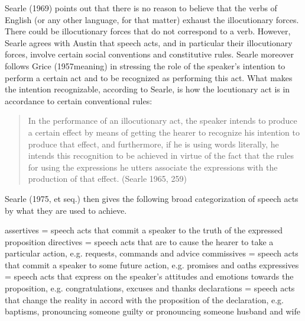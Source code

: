 Searle (1969) points out that there is no reason to believe that the verbs of English (or any other language, for that matter) exhaust the illocutionary forces. There could be illocutionary forces that do not correspond to a verb. However, Searle agrees with Austin that speech acts, and in particular their illocutionary forces, involve certain social conventions and constitutive rules. Searle moreover follows Grice (1957meaning) in stressing the role of the speaker’s intention to perform a certain act and to be recognized as performing this act. What makes the intention recognizable, according to Searle, is how the locutionary act is in accordance to certain conventional rules:

\begin{quote}
    

In the performance of an illocutionary act, the speaker intends to produce a certain effect by means of getting the hearer to recognize his intention to produce that effect, and furthermore, if he is using words literally, he intends this recognition to be achieved in virtue of the fact that the rules for using the expressions he utters associate the expressions with the production of that effect. \hfill (Searle 1965, 259)
\end{quote}

Searle (1975, et seq.) then gives the following broad categorization of speech acts by what they are used to achieve.

\bxl
assertives = speech acts that commit a speaker to the truth of the expressed proposition
\ex directives = speech acts that are to cause the hearer to take a particular action, e.g. requests, commands and advice
\ex commissives = speech acts that commit a speaker to some future action, e.g. promises and oaths
\ex expressives = speech acts that express on the speaker's attitudes and emotions towards the proposition, e.g. congratulations, excuses and thanks
\ex declarations = speech acts that change the reality in accord with the proposition of the declaration, e.g. baptisms, pronouncing someone guilty or pronouncing someone husband and wife
\exl
\eex

